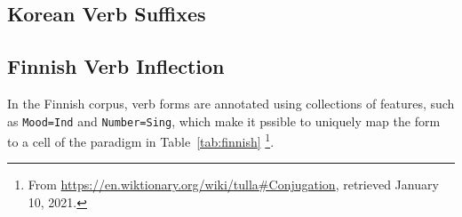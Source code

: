 \documentclass[11pt,letterpaper]{article}
\begin{document}

\subsection{Korean Verb Suffixes}



\subsection{Finnish Verb Inflection}

In the Finnish corpus, verb forms are annotated using collections of features, such as \texttt{Mood=Ind} and \texttt{Number=Sing}, which make it pssible to uniquely map the form to a cell of the paradigm in Table~\ref{tab:finnish} \footnote{From \url{https://en.wiktionary.org/wiki/tulla\#Conjugation}, retrieved January 10, 2021.}.
\end{document}

